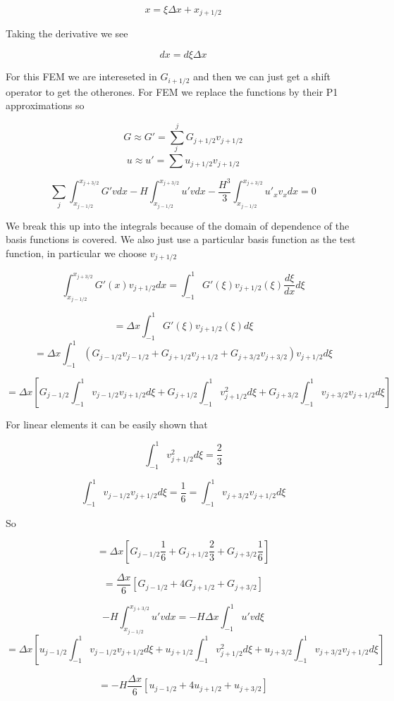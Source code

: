\documentclass[12pt]{article}
\begin{document}
$$x = \xi\Delta x + x_{j+1/2}$$

Taking the derivative we see

$$dx = d\xi\Delta x$$


For this FEM we are intereseted in $G_{i+1/2}$ and then we can just get a shift operator to get the otherones. For FEM we replace the functions by their P1 approximations so

\[G \approx G' = \sum^{j}G_{j+ 1/2}v_{j+ 1/2}\]
\[u \approx u' = \sum^{j}u_{j+ 1/2}v_{j+ 1/2}\]

\[\sum_{j}\int_{x_{j-1/2}}^{x_{j+3/2}} G'v dx - H\int_{x_{j-1/2}}^{x_{j+3/2}} u'v dx -  \frac{H^3}{3}\int_{x_{j-1/2}}^{x_{j+3/2}}u'_{x}v_{x}dx = 0 \]

We break this up into the integrals because of the domain of dependence of the basis functions is covered. We also just use a particular basis function as the test function, in particular we choose $v_{j + 1/2}$

\[\int_{x_{j-1/2}}^{x_{j+3/2}} G'(x)v_{j + 1/2} dx = \int_{-1}^{1} G'(\xi)v_{j + 1/2}(\xi) \frac{d \xi}{dx}d\xi\]

\[= \Delta x \int_{-1}^{1} G'(\xi)v_{j + 1/2}(\xi)d\xi\]
\[= \Delta x \int_{-1}^{1} \left(G_{j -1/2}v_{j - 1/2} + G_{j +1/2}v_{j + 1/2} + G_{j +3/2}v_{j +3/2}\right)v_{j + 1/2}d\xi\]

\[= \Delta x\left[G_{j -1/2} \int_{-1}^{1}v_{j - 1/2}v_{j + 1/2}d\xi + G_{j +1/2}\int_{-1}^{1}v_{j + 1/2}^2d\xi + G_{j +3/2}\int_{-1}^{1}v_{j +3/2}v_{j + 1/2}d\xi\right]\]

For linear elements it can be easily shown that 

\[\int_{-1}^{1}v_{j + 1/2}^2d\xi = \frac{2}{3}\]

\[\int_{-1}^{1}v_{j - 1/2}v_{j + 1/2}d\xi = \frac{1}{6} = \int_{-1}^{1}v_{j +3/2}v_{j + 1/2}d\xi \]

So 

\[= \Delta x\left[G_{j -1/2} \frac{1}{6}  + G_{j +1/2}\frac{2}{3} + G_{j +3/2}\frac{1}{6} \right]\]

\[= \frac{\Delta x}{6}\left[G_{j -1/2}  + 4G_{j +1/2} + G_{j +3/2} \right]\]

\[ - H\int_{x_{j-1/2}}^{x_{j+3/2}} u'v dx  = - H\Delta x\int_{-1}^{1} u'v d\xi \]
\[ =  \Delta x\left[u_{j -1/2} \int_{-1}^{1}v_{j - 1/2}v_{j + 1/2}d\xi + u_{j +1/2}\int_{-1}^{1}v_{j + 1/2}^2d\xi + u_{j +3/2}\int_{-1}^{1}v_{j +3/2}v_{j + 1/2}d\xi\right]\]

\[= -H\frac{\Delta x}{6}\left[u_{j -1/2}  + 4u_{j +1/2} + u_{j +3/2} \right]\]
\end{document}
